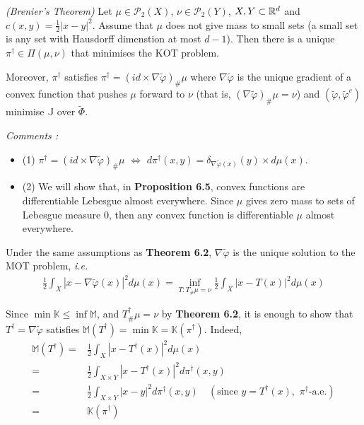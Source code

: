 \documentclass[12pt,a4paper]{article}
\newenvironment{proof}
{\begin{changemargin}{1cm}{0.5cm} 
	}%
	{\end{changemargin}
}
\renewenvironment{i}
{\begin{itemize} 
	}%
	{\end{itemize}
}
\newenvironment{p}
{\begin{proof} 
	}%
	{\end{proof}
}
\begin{document}
 \emph{(Brenier's Theorem)} Let $\mu \in \mathscr{P}_2(X)$, $\nu \in \mathscr{P}_2(Y)$, $X, Y\subset \mathbb{R}^d$ and $c(x,y) = \frac{1}{2} |x-y|^2$. Assume that $\mu$ does not give mass to small sets (a small set is any set with Hausdorff dimenstion at most $d-1$). Then there is a unique $\pi^{\dagger} \in \Pi(\mu, \nu)$ that minimises the KOT problem.

\quad Moreover, $\pi^{\dagger}$ satisfies $\pi^{\dagger} = (id \times \nabla \tilde{\varphi})_{\#} \mu$ where $\nabla \tilde{\varphi}$ is the unique gradient of a convex function that pushes $\mu$ forward to $\nu$ (that is, $(\nabla \tilde{\varphi})_{\#} \mu = \nu$) and $(\tilde{\varphi},\tilde{\varphi}^c)$ minimise $\mathbb{J}$ over $\tilde{\Phi}$.
\s

\emph{Comments :}
\begin{i}
\item[(1)] $\pi^{\dagger} = (id \times \nabla \tilde{\varphi})_{\#} \mu$ $\Leftrightarrow$ $d\pi^{\dagger}(x,y) = \delta_{\nabla \tilde{\varphi}(x)}(y) \times d\mu(x)$.
\item[(2)] We will show that, in \textbf{Proposition 6.5}, convex functions are differentiable Lebesgue almost everywhere. Since $\mu$ gives zero mass to sets of Lebesgue measure 0, then any convex function is differentiable $\mu$ almost everywhere.
\end{i}
\s

 Under the same assumptions as \textbf{Theorem 6.2}, $\nabla \tilde{\varphi}$ is the unique solution to the MOT problem, \textit{i.e.}
\begin{align*}
\frac{1}{2} \int_X |x- \nabla \tilde{\varphi}(x)|^2 d\mu(x) = \inf_{T: T_{\#}\mu = \nu} \frac{1}{2} \int_X |x- T(x)|^2 d\mu(x)
\end{align*}
\begin{p}
\pf Since $\min \mathbb{K} \leq \inf \mathbb{M}$, and $T^{\dagger}_{\#} \mu = \nu$ by \textbf{Theorem 6.2}, it is enough to show that $T^{\dagger} = \nabla \tilde{\varphi}$ satisfies $\mathbb{M}(T^{\dagger}) = \min \mathbb{K} = \mathbb{K}(\pi^{\dagger})$. Indeed,
\begin{align*}
\mathbb{M}(T^{\dagger}) =& \frac{1}{2} \int_X |x-T^{\dagger}(x)|^2 d\mu(x) \\
=& \frac{1}{2} \int_{X\times Y} |x- T^{\dagger}(x)|^2 d\pi^{\dagger}(x,y) \\
=& \frac{1}{2} \int_{X\times Y} |x-y|^2 d\pi^{\dagger} (x,y) \quad (\text{since } y =T^{\dagger}(x),\,\, \pi^{\dagger}\text{-a.e.}) \\
=& \mathbb{K}(\pi^{\dagger})
\end{align*}
\eop
\end{p}
\end{document}
